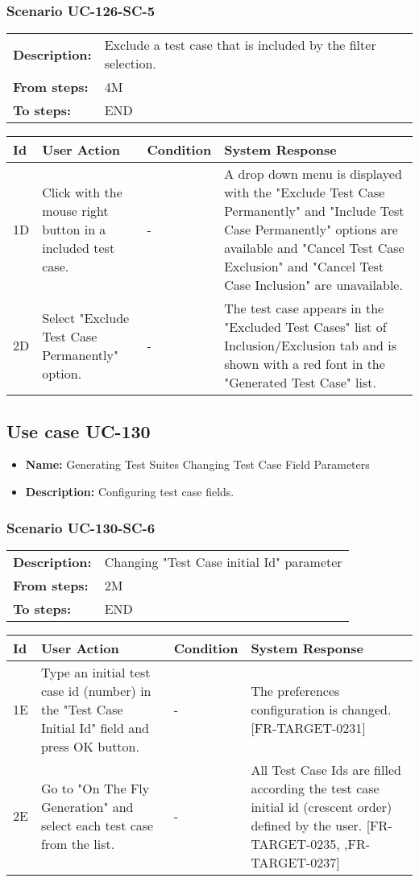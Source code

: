 \documentclass[a4paper,11pt]{article}
\newcommand{\bl}{\\ \hline}
\begin{document}
\subsubsection*{Scenario UC-126-SC-5}
\begin{tabular}{p{1in}p{4in}}
{\bf Description:} & Exclude a test case that is included by the filter selection. \\
{\bf From steps:} & 4M \\
{\bf To steps:} & END \\
\end{tabular}
 
\begin{tabular}{|p{0.8in}|p{1.6in}|p{1.6in}|p{1.6in}|}
\hline
Id & User Action & Condition & System Response  \bl 
1D & Click with the mouse right button in a included test case. & - & A drop down menu is displayed with the "Exclude Test Case Permanently" and "Include Test Case Permanently" options are available and "Cancel Test Case Exclusion" and "Cancel Test Case Inclusion" are unavailable. \bl 
2D & Select "Exclude Test Case Permanently" option. & - & The test case appears in the "Excluded Test Cases" list of Inclusion/Exclusion tab and is shown with a red font in the "Generated Test Case" list. \bl 
\end{tabular}
\subsection*{Use case UC-130}
\begin{itemize}
\item {\bf Name: }Generating Test Suites Changing Test Case Field Parameters
\item {\bf Description: }Configuring test case fields.
\end{itemize}
\subsubsection*{Scenario UC-130-SC-6}
\begin{tabular}{p{1in}p{4in}}
{\bf Description:} & Changing "Test Case initial Id" parameter \\
{\bf From steps:} & 2M \\
{\bf To steps:} & END \\
\end{tabular}
 
\begin{tabular}{|p{0.8in}|p{1.6in}|p{1.6in}|p{1.6in}|}
\hline
Id & User Action & Condition & System Response  \bl 
1E & Type an initial test case id (number) in the "Test Case Initial Id" field and press OK button. & - & The preferences configuration is changed. [FR-TARGET-0231] \bl 
2E & Go to "On The Fly Generation" and select each test case from the list. & - & All Test Case Ids are filled according the test case initial id (crescent order) defined by the user. [FR-TARGET-0235, ,FR-TARGET-0237] \bl 
\end{tabular}
\end{document}
